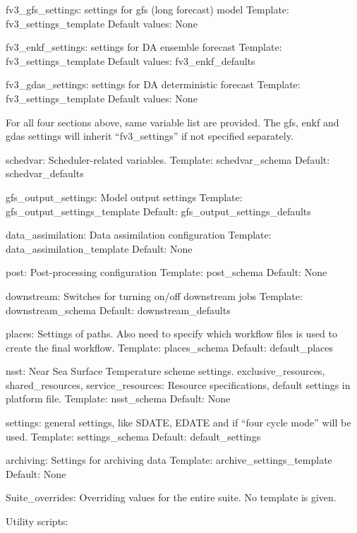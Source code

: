 fv3\-\_\-gfs\-\_\-settings\-: settings for gfs (long forecast) model Template\-: fv3\-\_\-settings\-\_\-template Default values\-: None

fv3\-\_\-enkf\-\_\-settings\-: settings for D\-A ensemble forecast Template\-: fv3\-\_\-settings\-\_\-template Default values\-: fv3\-\_\-enkf\-\_\-defaults

fv3\-\_\-gdas\-\_\-settings\-: settings for D\-A deterministic forecast Template\-: fv3\-\_\-settings\-\_\-template Default values\-: None

For all four sections above, same variable list are provided. The gfs, enkf and gdas settings will inherit “fv3\-\_\-settings” if not specified separately.

schedvar\-: Scheduler-\/related variables. Template\-: schedvar\-\_\-schema Default\-: schedvar\-\_\-defaults

gfs\-\_\-output\-\_\-settings\-: Model output settings Template\-: gfs\-\_\-output\-\_\-settings\-\_\-template Default\-: gfs\-\_\-output\-\_\-settings\-\_\-defaults

data\-\_\-assimilation\-: Data assimilation configuration Template\-: data\-\_\-assimilation\-\_\-template Default\-: None

post\-: Post-\/processing configuration Template\-: post\-\_\-schema Default\-: None

downstream\-: Switches for turning on/off downstream jobs Template\-: downstream\-\_\-schema Default\-: downstream\-\_\-defaults

places\-: Settings of paths. Also need to specify which workflow files is used to create the final workflow. Template\-: places\-\_\-schema Default\-: default\-\_\-places

nsst\-: Near Sea Surface Temperature scheme settings. exclusive\-\_\-resources, shared\-\_\-resources, service\-\_\-resources\-: Resource specifications, default settings in platform file. Template\-: nsst\-\_\-schema Default\-: None

settings\-: general settings, like S\-D\-A\-T\-E, E\-D\-A\-T\-E and if “four cycle mode” will be used. Template\-: settings\-\_\-schema Default\-: default\-\_\-settings

archiving\-: Settings for archiving data Template\-: archive\-\_\-settings\-\_\-template Default\-: None

Suite\-\_\-overrides\-: Overriding values for the entire suite. No template is given.

Utility scripts\-:

